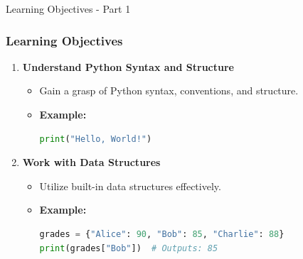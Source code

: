 \documentclass{beamer}
\begin{document}
\begin{frame}{Learning Objectives - Part 1}
    \frametitle{Learning Objectives}
    \begin{enumerate}
        \item \textbf{Understand Python Syntax and Structure}
            \begin{itemize}
                \item Gain a grasp of Python syntax, conventions, and structure.
                \item \textbf{Example:}
                \begin{lstlisting}[language=Python]
print("Hello, World!")
                \end{lstlisting}
            \end{itemize}
        \item \textbf{Work with Data Structures}
            \begin{itemize}
                \item Utilize built-in data structures effectively.
                \item \textbf{Example:}
                \begin{lstlisting}[language=Python]
grades = {"Alice": 90, "Bob": 85, "Charlie": 88}
print(grades["Bob"])  # Outputs: 85
                \end{lstlisting}
            \end{itemize}
    \end{enumerate}
\end{frame}
\end{document}

